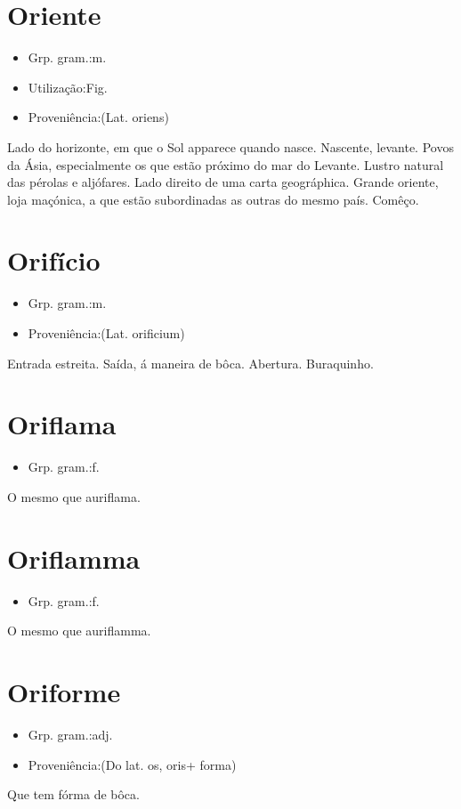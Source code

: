 \section{Oriente}
\begin{itemize}
\item {Grp. gram.:m.}
\end{itemize}
\begin{itemize}
\item {Utilização:Fig.}
\end{itemize}
\begin{itemize}
\item {Proveniência:(Lat. \textunderscore oriens\textunderscore )}
\end{itemize}
Lado do horizonte, em que o Sol apparece quando nasce.
Nascente, levante.
Povos da Ásia, especialmente os que estão próximo do mar do Levante.
Lustro natural das pérolas e aljófares.
Lado direito de uma carta geográphica.
\textunderscore Grande oriente\textunderscore , loja maçónica, a que estão subordinadas as outras do mesmo país.
Comêço.
\section{Orifício}
\begin{itemize}
\item {Grp. gram.:m.}
\end{itemize}
\begin{itemize}
\item {Proveniência:(Lat. \textunderscore orificium\textunderscore )}
\end{itemize}
Entrada estreita.
Saída, á maneira de bôca.
Abertura.
Buraquinho.
\section{Oriflama}
\begin{itemize}
\item {Grp. gram.:f.}
\end{itemize}
O mesmo que \textunderscore auriflama\textunderscore .
\section{Oriflamma}
\begin{itemize}
\item {Grp. gram.:f.}
\end{itemize}
O mesmo que \textunderscore auriflamma\textunderscore .
\section{Oriforme}
\begin{itemize}
\item {Grp. gram.:adj.}
\end{itemize}
\begin{itemize}
\item {Proveniência:(Do lat. \textunderscore os\textunderscore , \textunderscore oris\textunderscore  + \textunderscore forma\textunderscore )}
\end{itemize}
Que tem fórma de bôca.
